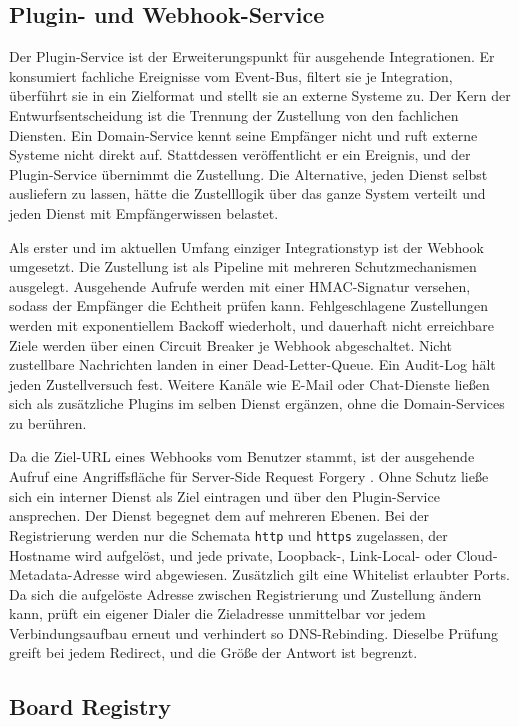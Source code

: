 \subsection{Plugin- und Webhook-Service}
\label{sub:plugin}

Der Plugin-Service ist der Erweiterungspunkt für ausgehende Integrationen. Er konsumiert fachliche Ereignisse vom Event-Bus, filtert sie je Integration, überführt sie in ein Zielformat und stellt sie an externe Systeme zu. Der Kern der Entwurfsentscheidung ist die Trennung der Zustellung von den fachlichen Diensten. Ein Domain-Service kennt seine Empfänger nicht und ruft externe Systeme nicht direkt auf. Stattdessen veröffentlicht er ein Ereignis, und der Plugin-Service übernimmt die Zustellung. Die Alternative, jeden Dienst selbst ausliefern zu lassen, hätte die Zustelllogik über das ganze System verteilt und jeden Dienst mit Empfängerwissen belastet.

Als erster und im aktuellen Umfang einziger Integrationstyp ist der Webhook umgesetzt. Die Zustellung ist als Pipeline mit mehreren Schutzmechanismen ausgelegt. Ausgehende Aufrufe werden mit einer HMAC-Signatur versehen, sodass der Empfänger die Echtheit prüfen kann. Fehlgeschlagene Zustellungen werden mit exponentiellem Backoff wiederholt, und dauerhaft nicht erreichbare Ziele werden über einen Circuit Breaker je Webhook abgeschaltet. Nicht zustellbare Nachrichten landen in einer Dead-Letter-Queue. Ein Audit-Log hält jeden Zustellversuch fest. Weitere Kanäle wie E-Mail oder Chat-Dienste ließen sich als zusätzliche Plugins im selben Dienst ergänzen, ohne die Domain-Services zu berühren.

Da die Ziel-URL eines Webhooks vom Benutzer stammt, ist der ausgehende Aufruf eine Angriffsfläche für Server-Side Request Forgery \cite{owaspssrf}. Ohne Schutz ließe sich ein interner Dienst als Ziel eintragen und über den Plugin-Service ansprechen. Der Dienst begegnet dem auf mehreren Ebenen. Bei der Registrierung werden nur die Schemata \texttt{http} und \texttt{https} zugelassen, der Hostname wird aufgelöst, und jede private, Loopback-, Link-Local- oder Cloud-Metadata-Adresse wird abgewiesen. Zusätzlich gilt eine Whitelist erlaubter Ports. Da sich die aufgelöste Adresse zwischen Registrierung und Zustellung ändern kann, prüft ein eigener Dialer die Zieladresse unmittelbar vor jedem Verbindungsaufbau erneut und verhindert so DNS-Rebinding. Dieselbe Prüfung greift bei jedem Redirect, und die Größe der Antwort ist begrenzt.

\subsection{Board Registry}
\label{sub:boardregistry}

